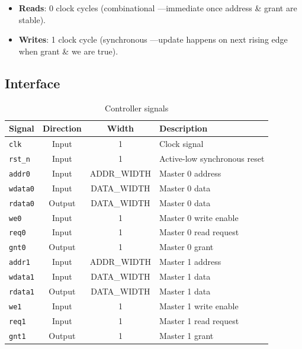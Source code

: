\begin{itemize}
    \item \textbf{Reads}: 0 clock cycles (combinational —immediate once address \& grant are stable).
    \item \textbf{Writes}: 1 clock cycle (synchronous —update happens on next rising edge when grant \& we are true).
\end{itemize}

\subsection{Interface}

\begin{table}[H]
    \centering
    \begin{tabular}{|l|c|c|l|}
        \hline
        \textbf{Signal}     & \textbf{Direction} & \textbf{Width} & \textbf{Description}            \\ \hline
        \texttt{clk}        & Input              & 1              & Clock signal                    \\ \hline
        \texttt{rst\_n}     & Input              & 1              & Active-low synchronous reset    \\ \hline
        \texttt{addr0}      & Input              & ADDR\_WIDTH    & Master 0 address                \\ \hline
        \texttt{wdata0}     & Input              & DATA\_WIDTH    & Master 0 data                   \\ \hline
        \texttt{rdata0}     & Output             & DATA\_WIDTH    & Master 0 data                   \\ \hline
        \texttt{we0}        & Input              & 1              & Master 0 write enable           \\ \hline
        \texttt{req0}       & Input              & 1              & Master 0 read request           \\ \hline
        \texttt{gnt0}       & Output             & 1              & Master 0 grant                  \\ \hline
        \texttt{addr1}      & Input              & ADDR\_WIDTH    & Master 1 address                \\ \hline
        \texttt{wdata1}     & Input              & DATA\_WIDTH    & Master 1 data                   \\ \hline
        \texttt{rdata1}     & Output             & DATA\_WIDTH    & Master 1 data                   \\ \hline
        \texttt{we1}        & Input              & 1              & Master 1 write enable           \\ \hline
        \texttt{req1}       & Input              & 1              & Master 1 read request           \\ \hline
        \texttt{gnt1}       & Output             & 1              & Master 1 grant                  \\ \hline
    \end{tabular}
    \caption{Controller signals}

\end{table}